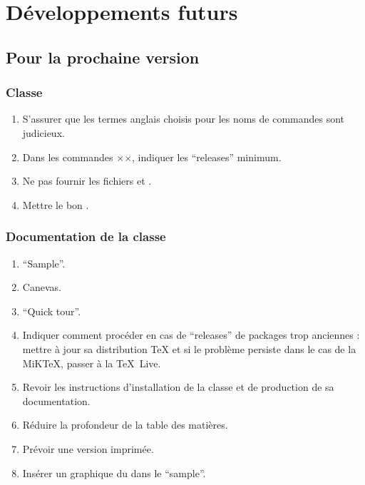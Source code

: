 \chapter{Développements futurs}\label{cha:devel-futurs}

\section{Pour la prochaine version}
\label{sec:pour-la-prochaine}

\subsection{Classe}
\label{sec:classe}

\begin{enumerate}
\item S'assurer que les termes anglais choisis pour les noms de commandes sont
  judicieux.
\item Dans les commandes ×\RequirePackage×, indiquer les \enquote{releases}
  minimum.
\item Ne pas fournir les fichiers  et
  .
\item Mettre le bon .
\end{enumerate}

\subsection{Documentation de la classe}
\label{sec:documentation-de-la}

\begin{enumerate}
\item \foreignquote{english}{Sample}.
\item Canevas.
\item \foreignquote{english}{Quick tour}.
\item Indiquer comment procéder en cas de \enquote{releases} de packages trop
  anciennes : mettre à jour sa distribution \TeX{} et si le problème persiste
  dans le cas de la MiK\TeX{}, passer à la \TeX~Live.
\item Revoir les instructions d'installation de la classe et de production de
  sa documentation.
\item Réduire la profondeur de la table des matières.
\item Prévoir une version imprimée.
\item Insérer un graphique du  dans le \foreignquote{english}{sample}.
\end{enumerate}

